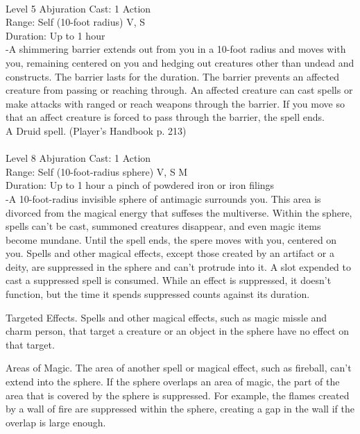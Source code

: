 \documentclass[10pt,twocolumn]{report}
\begin{document}
 \\
Level 5 \quad Abjuration \quad Cast: 1 Action\\
Range: Self (10-foot radius) \quad V, S\\
Duration: Up to 1 hour \quad \\
-A shimmering barrier extends out from you in a 10-foot radius and moves with you, remaining centered on you and hedging out creatures other than undead and constructs. 
The barrier lasts for the duration. The barrier prevents an affected creature from passing or reaching through. An affected creature can cast spells or make attacks with ranged or reach weapons through the barrier. 
If you move so that an affect creature is forced to pass through the barrier, the spell ends.\\
A Druid spell. (Player's Handbook p. 213) \\


 \\
Level 8 \quad Abjuration \quad Cast: 1 Action\\
Range: Self (10-foot-radius sphere) \quad V, S M\\
Duration: Up to 1 hour \quad a pinch of powdered iron or iron filings\\
-A 10-foot-radius invisible sphere of antimagic surrounds you. 
This area is divorced from the magical energy that suffeses the multiverse. Within the sphere, spells can’t be cast, summoned creatures disappear, and even magic items become mundane. Until the spell ends, the spere moves with you, centered on you. 
Spells and other magical effects, except those created by an artifact or a deity, are suppressed in the sphere and can’t protrude into it. A slot expended to cast a suppressed spell is consumed. While an effect is suppressed, it doesn’t function, but the time it spends suppressed counts against its duration. 

Targeted Effects. 
Spells and other magical effects, such as magic missle and charm person, that target a creature or an object in the sphere have no effect on that target. 

Areas of Magic. 
The area of another spell or magical effect, such as fireball, can’t extend into the sphere. If the sphere overlaps an area of magic, the part of the area that is covered by the sphere is suppressed. For example, the flames created by a wall of fire are suppressed within the sphere, creating a gap in the wall if the overlap is large enough. 
\end{document}
